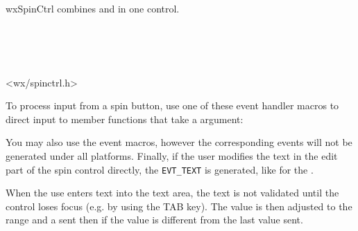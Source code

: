 %
%

\section{}\label{wxspinctrl}

wxSpinCtrl combines  and 
 in one control.


\\
\\
\\


<wx/spinctrl.h>


\twocolwidtha{5cm}
\begin{twocollist}\itemsep=0pt
\end{twocollist}


To process input from a spin button, use one of these event handler macros to direct input to member
functions that take a  argument:

\twocolwidtha{7cm}
\begin{twocollist}\itemsep=0pt
\end{twocollist}%

You may also use the  event macros, however
the corresponding events will not be generated under all platforms. Finally, if
the user modifies the text in the edit part of the spin control directly, the
{\tt EVT\_TEXT} is generated, like for the .

When the use enters text into the text area, the text is not
validated until the control loses focus (e.g. by using the TAB
key). The value is then adjusted to the range and a 
 sent then if the value
is different from the last value sent.

